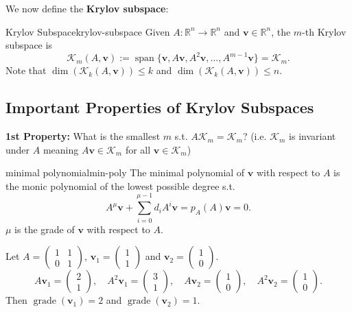 We now define the \textbf{Krylov subspace}:
\begin{definition}{Krylov Subspace}{krylov-subspace}
    Given $A: \mathbb{R}^n \to \mathbb{R}^n$ and $\mathbf{v} \in \mathbb{R}^n$, the $m$-th Krylov subspace is
    \[
        \mathcal{K}_m(A, \mathbf{v}) := \operatorname{span}\{\mathbf{v}, A\mathbf{v}, A^2\mathbf{v}, \ldots, A^{m-1}\mathbf{v}\} = \mathcal{K}_m.
    \]
    Note that $\dim(\mathcal{K}_k(A, \mathbf{v})) \leq k$ and $\dim(\mathcal{K}_k(A, \mathbf{v})) \leq n$.
\end{definition}

\subsection{Important Properties of Krylov Subspaces}
\textbf{1st Property:} What is the smallest $m$ s.t. $A\mathcal{K}_m = \mathcal{K}_m$? (i.e. $\mathcal{K}_m$ is invariant under $A$ meaning $A\mathbf{v} \in \mathcal{K}_m$ for all $\mathbf{v} \in \mathcal{K}_m$)
\begin{definition}{minimal polynomial}{min-poly}
    The minimal polynomial of $\mathbf{v}$ with respect to $A$ is the monic polynomial of the lowest possible degree s.t.
    \[
        A^\mu \mathbf{v} + \sum_{i=0}^{\mu-1} d_i A^i \mathbf{v} = p_A(A)\mathbf{v} = 0.
    \]
    $\mu$ is the grade of $\mathbf{v}$ with respect to $A$.
\end{definition}

\begin{example}{}{}
    Let $A = \begin{pmatrix}
            1 & 1 \\
            0 & 1
        \end{pmatrix}$,
    $\mathbf{v}_1 = \begin{pmatrix}
            1 \\ 1
        \end{pmatrix}$ and $\mathbf{v}_2 = \begin{pmatrix}
            1 \\ 0
        \end{pmatrix}$.
    \[
        A\mathbf{v}_1 = \begin{pmatrix}
            2 \\ 1
        \end{pmatrix}, \quad A^2\mathbf{v}_1 = \begin{pmatrix}
            3 \\ 1
        \end{pmatrix}, \quad A\mathbf{v}_2 = \begin{pmatrix}
            1 \\ 0
        \end{pmatrix}, \quad A^2\mathbf{v}_2 = \begin{pmatrix}
            1 \\ 0
        \end{pmatrix}.
    \]
    Then $\operatorname{grade}(\mathbf{v}_1) = 2$ and $\operatorname{grade}(\mathbf{v}_2) = 1$.
\end{example}

